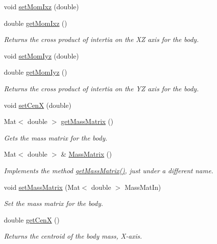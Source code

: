 \begin{DoxyCompactItemize}
void \hyperlink{class_body_ab76083304777794dd27769e1a35955b5}{set\-Mom\-Ixz} (double)
\item 
double \hyperlink{class_body_a946ad48ed4493008f4afbc5e89690bb5}{get\-Mom\-Ixz} ()
\begin{DoxyCompactList}\small\item\em Returns the cross product of intertia on the X\-Z axis for the body. \end{DoxyCompactList}\item 
void \hyperlink{class_body_a21a26c218ddbb7ee5b20e9ccdb0736f7}{set\-Mom\-Iyz} (double)
\item 
double \hyperlink{class_body_a5178058d29b5eaac87f21f26d5e935f6}{get\-Mom\-Iyz} ()
\begin{DoxyCompactList}\small\item\em Returns the cross product of intertia on the Y\-Z axis for the body. \end{DoxyCompactList}\item 
void \hyperlink{class_body_aeaacc5db3052196de8a6f7f61a8b6278}{set\-Cen\-X} (double)
\item 
Mat$<$ double $>$ \hyperlink{class_body_a4201150aa57d9d6f3aa245d8eca231d3}{get\-Mass\-Matrix} ()
\begin{DoxyCompactList}\small\item\em Gets the mass matrix for the body. \end{DoxyCompactList}\item 
Mat$<$ double $>$ \& \hyperlink{class_body_acb2895e81a595c7d168db48ff5dc766c}{Mass\-Matrix} ()
\begin{DoxyCompactList}\small\item\em Implements the method \hyperlink{class_body_a4201150aa57d9d6f3aa245d8eca231d3}{get\-Mass\-Matrix()}, just under a different name. \end{DoxyCompactList}\item 
void \hyperlink{class_body_a0708419d1aa905bc7bd38c2a10c58272}{set\-Mass\-Matrix} (Mat$<$ double $>$ Mass\-Mat\-In)
\begin{DoxyCompactList}\small\item\em Set the mass matrix for the body. \end{DoxyCompactList}\item 
double \hyperlink{class_body_a7723a89d7d4b893a82dd693571a9449a}{get\-Cen\-X} ()
\begin{DoxyCompactList}\small\item\em Returns the centroid of the body mass, X-\/axis. \end{DoxyCompactList}\item 

\end{DoxyCompactItemize}
